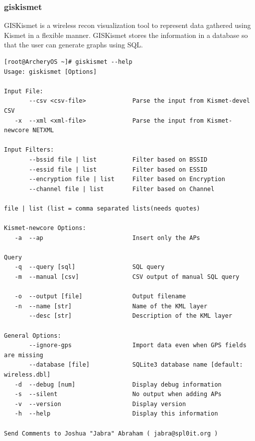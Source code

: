 \documentclass{article}
\begin{document}
\subsubsection{giskismet}
GISKismet is a wireless recon visualization tool to represent data gathered using Kismet in a flexible manner. GISKismet stores the information in a database so that the user can generate graphs using SQL.
\begin{lstlisting}
[root@ArcheryOS ~]# giskismet --help
Usage: giskismet [Options]

Input File:
       --csv <csv-file>             Parse the input from Kismet-devel CSV
   -x  --xml <xml-file>             Parse the input from Kismet-newcore NETXML

Input Filters: 
       --bssid file | list          Filter based on BSSID     
       --essid file | list          Filter based on ESSID 
       --encryption file | list     Filter based on Encryption 
       --channel file | list        Filter based on Channel

file | list (list = comma separated lists(needs quotes)

Kismet-newcore Options:
   -a  --ap                         Insert only the APs

Query
   -q  --query [sql]                SQL query
   -m  --manual [csv]               CSV output of manual SQL query

   -o  --output [file]              Output filename
   -n  --name [str]                 Name of the KML layer
       --desc [str]                 Description of the KML layer

General Options:                
       --ignore-gps                 Import data even when GPS fields are missing
       --database [file]            SQLite3 database name [default: wireless.dbl]
   -d  --debug [num]                Display debug information
   -s  --silent                     No output when adding APs
   -v  --version                    Display version
   -h  --help                       Display this information

Send Comments to Joshua "Jabra" Abraham ( jabra@spl0it.org )
\end{lstlisting}
\end{document}

